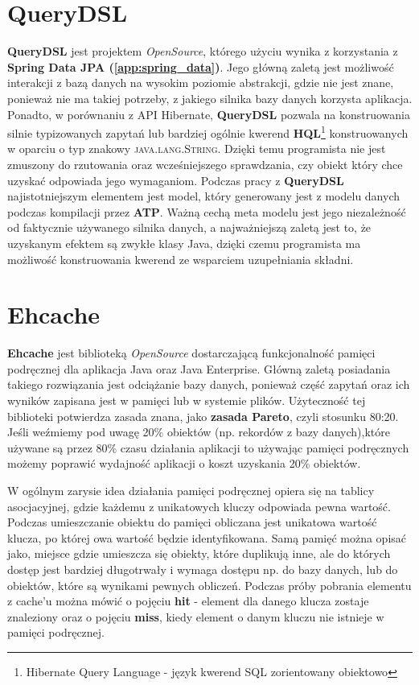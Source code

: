 \section{QueryDSL}
	\textbf{QueryDSL} jest projektem \textit{OpenSource}, którego użyciu wynika z korzystania z \textbf{Spring Data JPA (\ref{app:spring_data})}. Jego główną zaletą jest możliwość interakcji z bazą danych na wysokim poziomie abstrakcji, gdzie nie jest znane, ponieważ nie ma takiej potrzeby, z jakiego silnika bazy danych korzysta aplikacja. Ponadto, w porównaniu z API Hibernate, \textbf{QueryDSL} pozwala na konstruowania silnie typizowanych zapytań lub bardziej ogólnie kwerend \textbf{HQL}\footnote{Hibernate Query Language - język kwerend SQL zorientowany obiektowo} konstruowanych w oparciu o typ znakowy \textsc{java.lang.String}. Dzięki temu programista nie jest zmuszony do rzutowania oraz wcześniejszego sprawdzania, czy obiekt który chce uzyskać odpowiada jego wymaganiom.
	Podczas pracy z \textbf{QueryDSL} najistotniejszym elementem jest model, który generowany jest z modelu danych podczas kompilacji przez \textbf{ATP}.
	Ważną cechą meta modelu jest jego niezależność od faktycznie używanego silnika danych, a najważniejszą zaletą jest to, że uzyskanym efektem są
	zwykłe klasy Java, dzięki czemu programista ma możliwość konstruowania kwerend ze wsparciem uzupełniania składni. 
	
\section{Ehcache}
	\textbf{Ehcache} jest biblioteką \textit{OpenSource} dostarczającą funkcjonalność pamięci podręcznej dla aplikacja Java oraz Java Enterprise. 
	Główną zaletą posiadania takiego rozwiązania jest odciążanie bazy danych, ponieważ 	część zapytań oraz ich wyników zapisana jest w pamięci lub w systemie plików. 
	Użyteczność tej biblioteki potwierdza zasada znana, jako \textbf{zasada Pareto}, czyli stosunku 80:20. 
	Jeśli weźmiemy pod uwagę 20\% obiektów (np. rekordów z bazy danych),które używane są przez 80\% czasu działania aplikacji to 
	używając pamięci podręcznych możemy poprawić wydajność aplikacji o koszt uzyskania 20\% obiektów.
	
	W ogólnym zarysie idea działania pamięci podręcznej opiera się na tablicy asocjacyjnej, gdzie każdemu z unikatowych kluczy odpowiada pewna wartość.
	Podczas umieszczanie obiektu do pamięci obliczana jest unikatowa wartość klucza, po której owa wartość będzie identyfikowana. Samą pamięć można opisać jako,
	miejsce gdzie umieszcza się obiekty, które duplikują inne, ale do których dostęp jest bardziej długotrwały i wymaga dostępu np. do bazy danych, lub do obiektów,
	które są wynikami pewnych obliczeń. Podczas próby pobrania elementu z cache'u można mówić o pojęciu \textbf{hit} - element dla danego klucza zostaje znaleziony
	oraz o pojęciu \textbf{miss}, kiedy element o danym kluczu nie istnieje w pamięci podręcznej.\cite{ehcache_documentation_ref}
	
